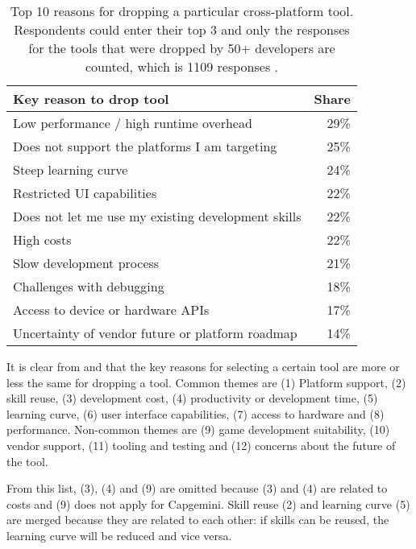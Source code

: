 \begin{table}[h]
    \begin{center}
        \begin{tabular}{lr}
            \hline
            Key reason to drop tool                            & Share \\
            \hline
            Low performance / high runtime overhead            & 29\%  \\
            Does not support the platforms I am targeting      & 25\%  \\
            Steep learning curve                               & 24\%  \\
            Restricted UI capabilities                         & 22\%  \\
            Does not let me use my existing development skills & 22\%  \\
            High costs                                         & 22\%  \\
            Slow development process                           & 21\%  \\
            Challenges with debugging                          & 18\%  \\
            Access to device or hardware APIs                  & 17\%  \\
            Uncertainty of vendor future or platform roadmap   & 14\%  \\
            \hline
        \end{tabular}
        \caption{Top 10 reasons for dropping a particular cross-platform tool. Respondents could enter their top 3 and only the responses for the tools that were dropped by 50+ developers are counted, which is 1109 responses \cite{VMCPT:2012}.}
        \label{tab:drop}
    \end{center}
\end{table}

It is clear from  and  that the key reasons for selecting a certain tool are more or less the same for dropping a tool. Common themes are (1) Platform support, (2) skill reuse, (3) development cost, (4) productivity or development time, (5) learning curve, (6) user interface capabilities, (7) access to hardware and (8) performance. Non-common themes are (9) game development suitability, (10) vendor support, (11) tooling and testing and (12) concerns about the future of the tool.

From this list, (3), (4) and (9) are omitted because (3) and (4) are related to costs and (9) does not apply for Capgemini. Skill reuse (2) and learning curve (5) are merged because they are related to each other: if skills can be reused, the learning curve will be reduced and vice versa.  


